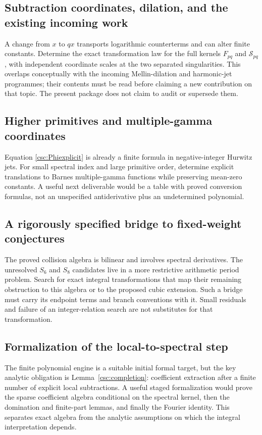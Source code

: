 \documentclass[11pt,a4paper]{article}
\numberwithin{equation}{section}
\theoremstyle{definition}
\begin{document}
\subsection{Subtraction coordinates, dilation, and the existing incoming work}
A change from $x$ to $qx$ transports logarithmic counterterms and can alter finite constants. Determine the exact transformation law for the full kernels $F_{pq}$ and $\mathcal S_{pq}$, with independent coordinate scales at the two separated singularities. This overlaps conceptually with the incoming Mellin-dilation and harmonic-jet programmes; their contents must be read before claiming a new contribution on that topic. The present package does not claim to audit or supersede them.

\subsection{Higher primitives and multiple-gamma coordinates}
Equation \eqref{csc:Phiexplicit} is already a finite formula in negative-integer Hurwitz jets. For small spectral index and large primitive order, determine explicit translations to Barnes multiple-gamma functions while preserving mean-zero constants. A useful next deliverable would be a table with proved conversion formulas, not an unspecified antiderivative plus an undetermined polynomial.

\subsection{A rigorously specified bridge to fixed-weight conjectures}
The proved collision algebra is bilinear and involves spectral derivatives. The unresolved $S_6$ and $S_8$ candidates live in a more restrictive arithmetic period problem. Search for exact integral transformations that map their remaining obstruction to this algebra or to the proposed cubic extension. Such a bridge must carry its endpoint terms and branch conventions with it. Small residuals and failure of an integer-relation search are not substitutes for that transformation.

\subsection{Formalization of the local-to-spectral step}
The finite polynomial engine is a suitable initial formal target, but the key analytic obligation is Lemma~\ref{csc:completion}: coefficient extraction after a finite number of explicit local subtractions. A useful staged formalization would prove the sparse coefficient algebra conditional on the spectral kernel, then the domination and finite-part lemmas, and finally the Fourier identity. This separates exact algebra from the analytic assumptions on which the integral interpretation depends.
\end{document}
